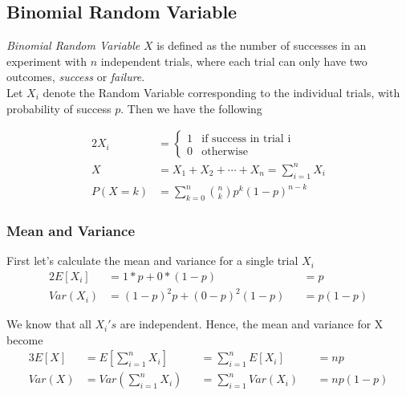 \documentclass[../../probability-notes.tex]{subfiles}
\begin{document}
    \subsection{Binomial Random Variable}
    \emph{Binomial Random Variable} $X$ is defined as the number of successes in an experiment with $n$ independent trials, where each trial can only have two outcomes, \emph{success} or \emph{failure}.\\
    Let $X_{i}$ denote the Random Variable corresponding to the individual trials, with probability of success $p$. Then we have the following

    \begin{alignat*}{2}
        X_{i} &= \begin{cases} 1 &\mbox{if success in trial i}\\ 
                                0 &\mbox{otherwise} \end{cases} \tag*{indicator variable} \\
        X &= X_{1} + X_{2} + \cdots + X_{n} = \sum_{i=1}^{n} X_{i} \\
        P(X=k) &= \sum_{k=0}^{n} \binom{n}{k} p^{k} (1 - p)^{n-k}
    \end{alignat*}

    \subsubsection{Mean and Variance}
    First let's calculate the mean and variance for a single trial $X_{i}$
    \begin{alignat*}{2}
        E[X_{i}] &= 1 * p + 0 * (1 - p) &&= p\\
        Var(X_{i}) &= (1 - p)^{2}p + (0-p)^{2}(1-p) &&= p(1-p)
    \end{alignat*}
    
    We know that all $X_{i}'s$ are independent. Hence, the mean and variance for X become
    \begin{alignat*}{3}
        E[X] &= E[\sum_{i=1}^{n} X_{i}] &&= \sum_{i=1}^{n}E[X_{i}] &&= np \\
        Var(X) &= Var(\sum_{i=1}^{n} X_{i}) &&= \sum_{i=1}^{n} Var(X_{i}) &&= np(1-p)
    \end{alignat*}
\end{document}
